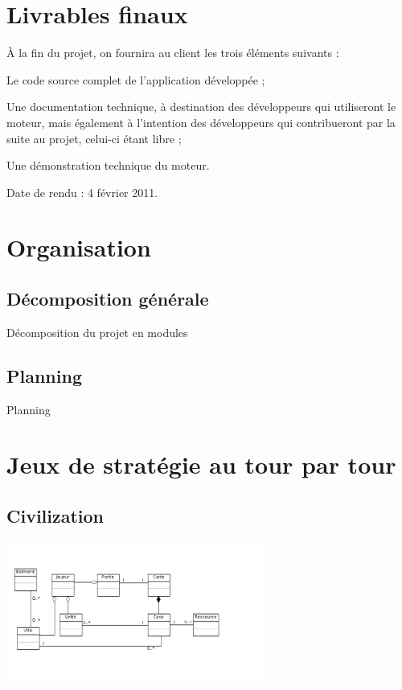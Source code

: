 \documentclass[a4paper,10pt]{report}
\begin{document}
  \chapter{Livrables finaux}

    À la fin du projet, on fournira au client les trois éléments suivants : 
    
    \begin{list}{-}{}
      \item{Le code source complet de l'application développée ;}
      \item{Une documentation technique, à destination des développeurs qui utiliseront le moteur, mais également à l'intention des développeurs qui contribueront par la suite au projet, celui-ci étant libre ;}
      \item{Une démonstration technique du moteur.}
    \end{list}
    
    Date de rendu : 4 février 2011.



  \chapter{Organisation}

    \section{Décomposition générale}

      Décomposition du projet en modules


    \section{Planning}

      Planning


\appendix

\chapter{Jeux de stratégie au tour par tour}

	\section{Civilization}

		\includegraphics[width=320px]{diagrammes/concept_civilization.png}
\end{document}
